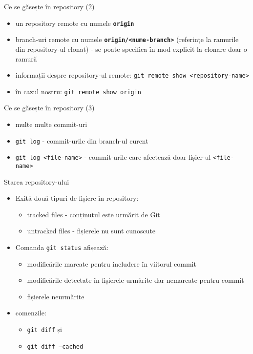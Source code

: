 \documentclass{beamer}
\begin{document}
\begin{frame}{Ce se găsește în repository (2)}
\begin{itemize} %
\item un repository remote cu numele \texttt{\textbf{origin}}
\item branch-uri remote cu numele \textbf{\texttt{origin/<nume-branch>}} (referințe la ramurile din repository-ul clonat) - se poate specifica în mod explicit la clonare doar o ramură
\\
\item informații despre repository-ul remote: \texttt{git remote show <repository-name>}
\item în cazul nostru: \texttt{git remote show origin}
\end{itemize}
\end{frame}

\begin{frame}{Ce se găsește în repository (3)}
\begin{itemize} %
\item multe multe commit-uri
\item \texttt{git log} - commit-urile din branch-ul curent
\item \texttt{git log <file-name>} - commit-urile care afectează doar fișier-ul \texttt{<file-name>}
\end{itemize}
\end{frame}

\begin{frame}{Starea repository-ului}
\begin{itemize} %
\item Exită două tipuri de fișiere în repository:
\begin{itemize} %
	\item tracked files - conținutul este urmărit de Git
	\item untracked files - fișierele nu sunt cunoscute
\end{itemize}
\pause\item Comanda \texttt{git status} afișează:
\begin{itemize} %
	\item modificările marcate pentru includere în viitorul commit
	\item modificările detectate în fișierele urmărite dar nemarcate pentru commit
	\item fișierele neurmărite
\end{itemize}
\item comenzile:
\begin{itemize} %
	\item \texttt{git diff} și
	\item \texttt{git diff --cached}
\end{itemize}
\end{itemize}
\end{frame}
\end{document}
